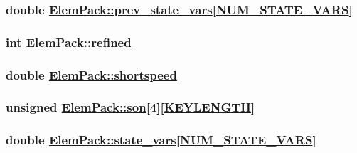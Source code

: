 \hypertarget{structElemPack_o31}{
\subsubsection[prev\_\-state\_\-vars]{\setlength{\rightskip}{0pt plus 5cm}double \hyperlink{structElemPack_o31}{Elem\-Pack::prev\_\-state\_\-vars}\mbox{[}\hyperlink{constant_8h_a45}{NUM\_\-STATE\_\-VARS}\mbox{]}}}
\label{structElemPack_o31}


\hypertarget{structElemPack_o8}{
\subsubsection[refined]{\setlength{\rightskip}{0pt plus 5cm}int \hyperlink{structElemPack_o8}{Elem\-Pack::refined}}}
\label{structElemPack_o8}


\hypertarget{structElemPack_o33}{
\subsubsection[shortspeed]{\setlength{\rightskip}{0pt plus 5cm}double \hyperlink{structElemPack_o33}{Elem\-Pack::shortspeed}}}
\label{structElemPack_o33}


\hypertarget{structElemPack_o23}{
\subsubsection[son]{\setlength{\rightskip}{0pt plus 5cm}unsigned \hyperlink{structElemPack_o23}{Elem\-Pack::son}\mbox{[}4\mbox{]}\mbox{[}\hyperlink{constant_8h_a10}{KEYLENGTH}\mbox{]}}}
\label{structElemPack_o23}


\hypertarget{structElemPack_o30}{
\subsubsection[state\_\-vars]{\setlength{\rightskip}{0pt plus 5cm}double \hyperlink{structElemPack_o30}{Elem\-Pack::state\_\-vars}\mbox{[}\hyperlink{constant_8h_a45}{NUM\_\-STATE\_\-VARS}\mbox{]}}}
\label{structElemPack_o30}


